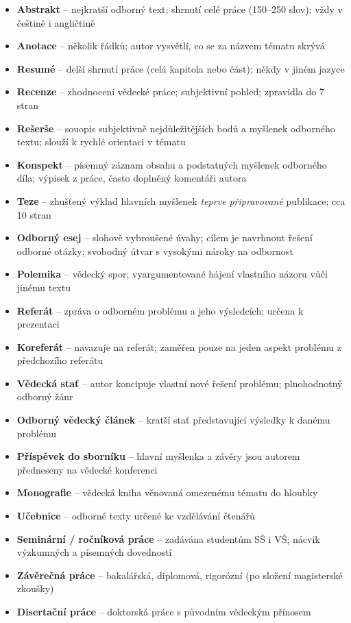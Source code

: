 \begin{itemize}
  \item \textbf{Abstrakt} -- nejkratší odborný text; shrnutí celé práce (150--250 slov); vždy v češtině i angličtině
  \item \textbf{Anotace} -- několik řádků; autor vysvětlí, co se za názvem tématu skrývá
  \item \textbf{Resumé} -- delší shrnutí práce (celá kapitola nebo část); někdy v jiném jazyce
  \item \textbf{Recenze} -- zhodnocení vědecké práce; subjektivní pohled; zpravidla do 7 stran
  \item \textbf{Rešerše} -- souopis subjektivně nejdůležitějších bodů a myšlenek odborného textu; slouží k rychlé orientaci v tématu
  \item \textbf{Konspekt} -- písemný záznam obsahu a podstatných myšlenek odborného díla; výpisek z práce, často doplněný komentáři autora
  \item \textbf{Teze} -- zhušťený výklad hlavních myšlenek \textit{teprve připravované} publikace; cca 10 stran
  \item \textbf{Odborný esej} -- slohově vybroušené úvahy; cílem je navrhnout řešení odborné otázky; svobodný útvar s vysokými nároky na odbornost
  \item \textbf{Polemika} -- vědecký spor; vyargumentované hájení vlastního názoru vůči jinému textu
  \item \textbf{Referát} -- zpráva o odborném problému a jeho výsledcích; určena k prezentaci
  \item \textbf{Koreferát} -- navazuje na referát; zaměřen pouze na jeden aspekt problému z předchozího referátu
  \item \textbf{Vědecká stať} -- autor koncipuje vlastní nové řešení problému; plnohodnotný odborný žánr
  \item \textbf{Odborný vědecký článek} -- kratší stať představující výsledky k danému problému
  \item \textbf{Příspěvek do sborníku} -- hlavní myšlenka a závěry jsou autorem předneseny na vědecké konferenci
  \item \textbf{Monografie} -- vědecká kniha věnovaná omezenému tématu do hloubky
  \item \textbf{Učebnice} -- odborné texty určené ke vzdělávání čtenářů
  \item \textbf{Seminární / ročníková práce} -- zadávána studentům SŠ i VŠ; nácvik výzkumných a písemných dovedností
  \item \textbf{Závěrečná práce} -- bakalářská, diplomová, rigorózní (po složení magisterské zkoušky)
  \item \textbf{Disertační práce} -- doktorská práce s původním vědeckým přínosem
\end{itemize}

